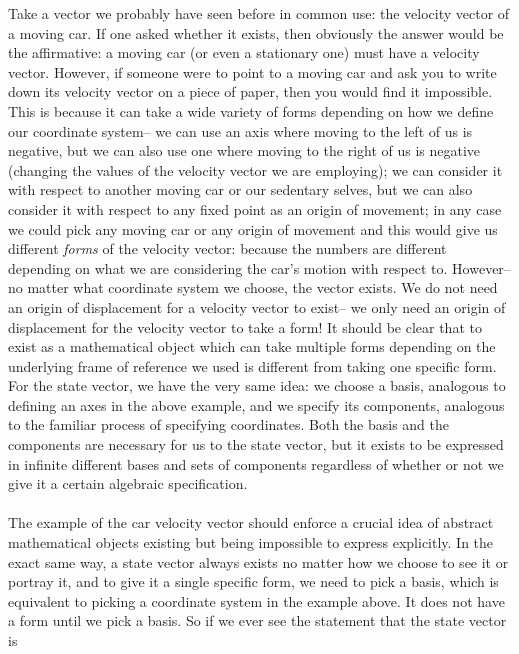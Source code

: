 Take a vector we probably have seen before in common use: the velocity vector of a moving car. If one asked whether it exists, then obviously the answer would be the affirmative: a moving car (or even a stationary one) must have a velocity vector. However, if someone were to point to a moving car and ask you to write down its velocity vector on a piece of paper, then you would find it impossible. This is because it can take a wide variety of forms depending on how we define our coordinate system-- we can use an axis where moving to the left of us is negative, but we can also use one where moving to the right of us is negative (changing the values of the velocity vector we are employing); we can consider it with respect to another moving car or our sedentary selves, but we can also consider it with respect to any fixed point as an origin of movement; in any case we could pick any moving car or any origin of movement and this would give us different \textit{forms} of the velocity vector: because the numbers are different depending on what we are considering the car's motion with respect to. However-- no matter what coordinate system we choose, the vector exists. We do not need an origin of displacement for a velocity vector to exist-- we only need an origin of displacement for the velocity vector to take a form! It should be clear that to exist as a mathematical object which can take multiple forms depending on the underlying frame of reference we used is different from taking one specific form. For the state vector, we have the very same idea: we choose a basis, analogous to defining an axes in the above example, and we specify its components, analogous to the familiar process of specifying coordinates. Both the basis and the components are necessary for us to  the state vector, but it exists to be expressed in infinite different bases and sets of components regardless of whether or not we give it a certain algebraic specification.  %
\\\\
The example of the car velocity vector should enforce a crucial idea of abstract mathematical objects existing but being impossible to express explicitly. In the exact same way, a state vector always exists no matter how we choose to see it or portray it, and to give it a single specific form, we need to pick a basis, which is equivalent to picking a coordinate system in the example above. It does not have a form until we pick a basis. So if we ever see the statement that the state vector is 

